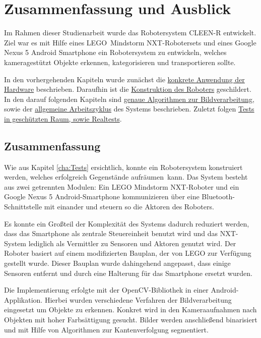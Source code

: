 \chapter{Zusammenfassung und Ausblick}
\label{cha:Fazit}

Im Rahmen dieser Studienarbeit wurde das Robotersystem CLEEN-R entwickelt. Ziel war es mit Hilfe eines LEGO\textregistered\ Mindstorm NXT-Robotersets und eines Google Nexus 5 Android Smartphone ein Robotersystem zu entwickeln, welches kameragestützt Objekte erkennen, kategorisieren und transportieren sollte. 

In den vorhergehenden Kapiteln wurde zunächst die \hyperref[cha:Materials]{konkrete Anwendung der Hardware}  beschrieben. Daraufhin ist die \hyperref[cha:robot]{Konstruktion des Roboters} geschildert. In den darauf folgenden Kapiteln sind \hyperref[cha:Software]{genaue Algorithmen zur Bildverarbeitung}, sowie der \hyperref[cha:Workloop]{allgemeine Arbeitszyklus} des Systems beschrieben. Zuletzt folgen \hyperref[cha:Tests]{Tests in geschützten Raum, sowie Realtests}.

\section{Zusammenfassung}

Wie aus Kapitel \ref{cha:Tests} ersichtlich, konnte ein Robotersystem konstruiert werden, welches erfolgreich Gegenstände \glqq aufräumen\grqq\ kann. Das System besteht aus zwei getrennten Modulen: Ein LEGO Mindstorm NXT-Roboter und ein Google Nexus 5 Android-Smartphone kommunizieren über eine Bluetooth-Schnittstelle mit einander und steuern so die Aktoren des Roboters. 

Es konnte ein Großteil der Komplexität des Systems dadurch reduziert werden, dass das Smartphone als zentrale Steuereinheit benutzt wird und das NXT-System lediglich als Vermittler zu Sensoren und Aktoren genutzt wird. Der Roboter basiert auf einem modifizierten Bauplan, der von LEGO zur Verfügung gestellt wurde. Dieser Bauplan wurde dahingehend angepasst, dass einige Sensoren entfernt und durch eine Halterung für das Smartphone ersetzt wurden.

Die Implementierung erfolgte mit der OpenCV-Bibliothek in einer Android-Applikation. Hierbei wurden verschiedene Verfahren der Bildverarbeitung eingesetzt um Objekte zu erkennen. Konkret wird in den Kameraaufnahmen nach Objekten mit hoher Farbsättigung gesucht. Bilder werden anschließend binarisiert und mit Hilfe von Algorithmen zur Kantenverfolgung segmentiert. 

